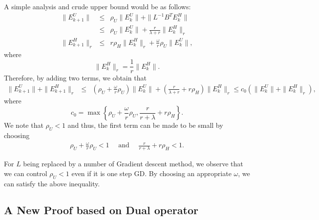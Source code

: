 A simple analysis and crude upper bound would be as follows: 
\begin{eqnarray*}
\|E_{k+1}^U\| &\leq& \rho_U \|E_k^U\| + \|L^{-1} B^T E_k^H\| \\ 
&\leq&  \rho_U \|E_k^U\| + \frac{r}{\lambda + r} \|E_k^H\|_r \\
\|E_{k+1}^H\|_r &\leq& r \rho_H \|E_k^H\|_r + \frac{\omega}{r} \rho_U \|E_k^U\|,  
\end{eqnarray*}
where 
\begin{equation}
\|E_k^H\|_r = \frac{1}{r}\|E_k^H\|.   
\end{equation}
Therefore, by adding two terms, we obtain that 
\begin{eqnarray*}
\|E_{k+1}^U\| + \|E_{k+1}^H\|_r &\leq& \left ( \rho_U + \frac{\omega}{r} \rho_U \right) \|E_k^U\| + \left ( \frac{r}{\lambda + r} + r \rho_H \right ) \|E_k^H\|_r \leq c_0 \left ( \|E_{k}^U\| + \|E_{k}^H\|_r \right ),  
\end{eqnarray*}
where 
\begin{equation}
c_0 = \max \left \{ \rho_U + \frac{\omega}{r} \rho_U, \frac{r}{r+\lambda} + r\rho_H \right \}. 
\end{equation} 
We note that $\rho_U < 1$ and thus, the first term can be made to be small by choosing 
\begin{eqnarray}
\rho_U + \frac{\omega}{r} \rho_U < 1 \quad \mbox{ and } \quad \frac{r}{r+\lambda} + r\rho_H < 1. 
\end{eqnarray}
\begin{remark}
For $L$ being replaced by a number of Gradient descent method, we observe that we can control $\rho_U < 1$ even if it is one step GD. By choosing an appropriate $\omega$, we can satisfy the above inequality. 
\end{remark}

 
\subsection{A New Proof based on Dual operator}

